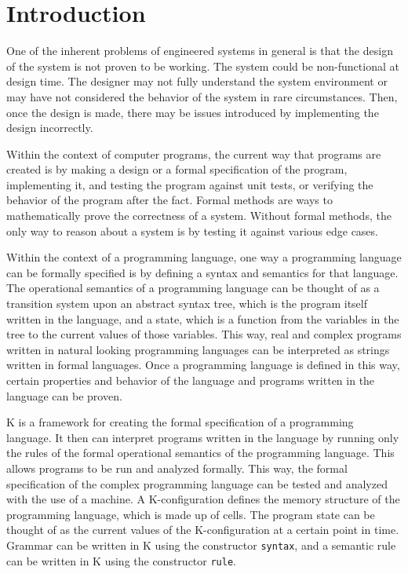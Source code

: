 \chapter{Introduction}
One of the inherent problems of engineered systems in general is that the design of the system is not proven to be working. The system could be non-functional at design time. The designer may not fully understand the system environment or may have not considered the behavior of the system in rare circumstances. Then, once the design is made, there may be issues introduced by implementing the design incorrectly.

Within the context of computer programs, the current way that programs are created is by making a design or a formal specification of the program, implementing it, and testing the program against unit tests, or verifying the behavior of the program after the fact.
Formal methods are ways to mathematically prove the correctness of a system. Without formal methods, the only way to reason about a system is by testing it against various edge cases.

Within the context of a programming language, one way a programming language can be formally specified is by defining a syntax and semantics for that language.
The operational semantics of a programming language can be thought of as a transition system upon an abstract syntax tree, which is the program itself written in the language, and a state, which is a function from the variables in the tree to the current values of those variables. 
This way, real and complex programs written in natural looking programming languages can be interpreted as strings written in formal languages. Once a programming language is defined in this way, certain properties and behavior of the language and programs written in the language can be proven.

K is a framework for creating the formal specification of a programming language. It then can interpret programs written in the language by running only the rules of the formal operational semantics of the programming language. This allows programs to be run and analyzed formally. This way, the formal specification of the complex programming language can be tested and analyzed with the use of a machine.
A K-configuration defines the memory structure of the programming language, which is made up of cells. The program state can be thought of as the current values of the K-configuration at a certain point in time.
Grammar can be written in K using the constructor \texttt{syntax}, and a semantic rule can be written in K using the constructor \texttt{rule}.

